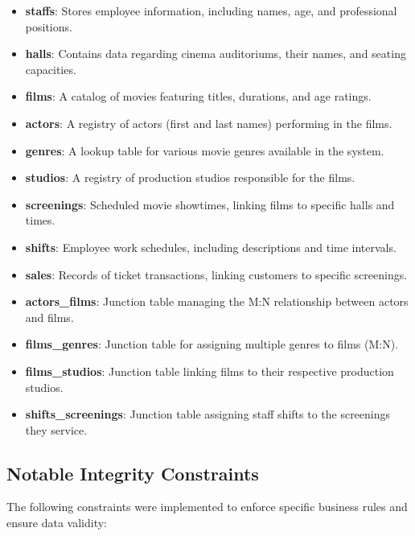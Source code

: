 \documentclass[11pt, a4paper]{article}
\begin{document}
\begin{itemize}
    \item \textbf{staffs}: Stores employee information, including names, age, and professional positions.
    \item \textbf{halls}: Contains data regarding cinema auditoriums, their names, and seating capacities.
    \item \textbf{films}: A catalog of movies featuring titles, durations, and age ratings.
    \item \textbf{actors}: A registry of actors (first and last names) performing in the films.
    \item \textbf{genres}: A lookup table for various movie genres available in the system.
    \item \textbf{studios}: A registry of production studios responsible for the films.
    \item \textbf{screenings}: Scheduled movie showtimes, linking films to specific halls and times.
    \item \textbf{shifts}: Employee work schedules, including descriptions and time intervals.
    \item \textbf{sales}: Records of ticket transactions, linking customers to specific screenings.
    \item \textbf{actors\_films}: Junction table managing the M:N relationship between actors and films.
    \item \textbf{films\_genres}: Junction table for assigning multiple genres to films (M:N).
    \item \textbf{films\_studios}: Junction table linking films to their respective production studios.
    \item \textbf{shifts\_screenings}: Junction table assigning staff shifts to the screenings they service.
\end{itemize}

\subsection{Notable Integrity Constraints}
The following constraints were implemented to enforce specific business rules and ensure data validity:
\end{document}
